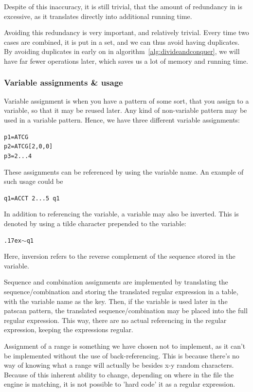 \documentclass[12pt]{article}
\theoremstyle{definition}
\begin{document}
Despite of this inaccuracy, it is still trivial, that the amount of redundancy in is excessive, as it translates directly into additional running time.

Avoiding this redundancy is very important, and relatively trivial. Every time two cases are combined, it is put in a set, and we can thus avoid having duplicates. By avoiding duplicates in early on in algorithm~\ref{alg:divideandconquer}, we will have far fewer operations later, which saves us a lot of memory and running time.


\subsubsection{Variable assignments \& usage}

Variable assignment is when you have a pattern of some sort, that you assign to a variable, so that it may be reused later. Any kind of non-variable pattern may be used in a variable pattern. Hence, we have three different variable assignments:

\texttt{p1=ATCG} \\
\texttt{p2=ATCG[2,0,0]} \\
\texttt{p3=2...4}

These assignments can be referenced by using the variable name. An example of such usage could be

\texttt{q1=ACCT 2...5 q1}

In addition to referencing the variable, a variable may also be inverted. This is denoted by using a tilde character prepended to the variable:

\texttt{{\raise.17ex\hbox{$\scriptstyle\mathtt{\sim}$}}q1}

Here, inversion refers to the reverse complement of the sequence stored in the variable.

Sequence and combination assignments are implemented by translating the sequence/combination and storing the translated regular expression in a table, with the variable name as the key. Then, if the variable is used later in the patscan pattern, the translated sequence/combination may be placed into the full regular expression. This way, there are no actual referencing in the regular expression, keeping the expressions regular.

Assignment of a range is something we have chosen not to implement, as it can't be implemented without the use of back-referencing. This is because there's no way of knowing what a range will actually be besides x-y random characters. Because of this inherent ability to change, depending on where in the file the engine is matching, it is not possible to 'hard code' it as a regular expression.
\end{document}
